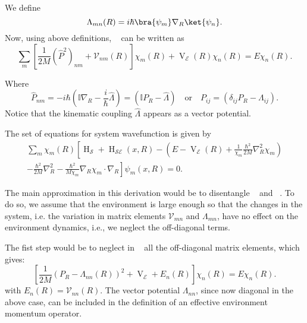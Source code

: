 We define
\begin{equation}
    \Lambda_{mn}(R) = i\hbar \bra{\psi_m}\nabla_R\ket{\psi_n}.
\end{equation}
Now, using above definitions, ~ can be written as
\begin{equation}
    \label{eqn:chap2_clc_evol}
    \sum_m \left[ \frac{1}{2M} ({\hat{P}}^2)_{nm} +  
    \mathcal{V}_{nm}(R)\right] \chi_m(R) + \operatorname{V}_{\mathcal{E}}(R) \chi_n(R) 
    = E \chi_n(R).
\end{equation}

Where
\begin{equation}
    {\hat{P}}_{nm} = -i\hbar \left(\mathbb{I}\nabla_R - \frac{i}{\hbar}
    \hat{\Lambda} \right) =
 \left(\mathbb{I}P_R - \hat{\Lambda}\right) \quad \text{or} \quad P_{ij} = 
 \left(\delta_{ij}P_R - {\Lambda}_{ij}\right).
\end{equation}
Notice that the kinematic coupling
$\hat{\Lambda}$ appears as a vector potential. 

The set of equations for system wavefunction is given by
\begin{multline}
    \label{eqn:chap2_system_evol}
    \sum_{m} \chi_m(R) \left[
    \operatorname{H}_{\mathcal{S}} + \operatorname{H}_{\mathcal{SE}}(x, R)  - \left(
        E - \operatorname{V}_{\mathcal{E}}(R) + 
        \frac{1}{\chi_m} \frac{\hbar^2}{2M} \nabla_R^2 \chi_m
    \right) \right. \\\left. - \frac{\hbar^2}{2M} \nabla_R^2 - 
    \frac{\hbar^2}{M\chi_m} \nabla_R \chi_m \cdot \nabla_R \right] \psi_m(x, R) = 0.
\end{multline}

The main approximation in this derivation would be to disentangle 
~ and ~. To do so, 
we assume that the environment is large enough so that the changes in the system,
i.e. the variation in matrix elements $\mathcal{V}_{mn}$ and $\Lambda_{mn}$, have
no effect on the environment dynamics, i.e., we neglect the off-diagonal terms. 

The fist step would be to neglect in ~  all the off-diagonal
matrix elements, which gives:
\begin{equation}
\label{eq:chap2_no_off_diag}
    \left[ \frac{1}{2M} \left(P_R -  
    \Lambda_{nn}(R)\right)^2 + \operatorname{V}_{\mathcal{E}} + E_n(R) \right] \chi_n(R) = E \chi_n(R).
\end{equation}
with \(E_n(R) = \mathcal{V}_{nn}(R) \). The vector potential \(\Lambda_{nn}\), since now diagonal in the above case, can be included in the
definition of an effective environment momentum operator. 

